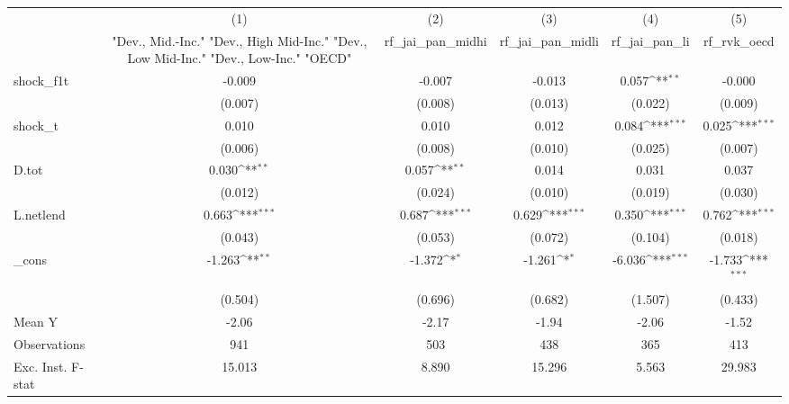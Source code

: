 {
\def\sym#1{\ifmmode^{#1}\else\(^{#1}\)\fi}
\begin{tabular}{l*{5}{c}}
\toprule
            &\multicolumn{1}{c}{(1)}&\multicolumn{1}{c}{(2)}&\multicolumn{1}{c}{(3)}&\multicolumn{1}{c}{(4)}&\multicolumn{1}{c}{(5)}\\
            &\multicolumn{1}{c}{ "Dev., Mid.-Inc." "Dev., High Mid-Inc." "Dev., Low Mid-Inc." "Dev., Low-Inc." "OECD" }&\multicolumn{1}{c}{rf\_jai\_pan\_midhi}&\multicolumn{1}{c}{rf\_jai\_pan\_midli}&\multicolumn{1}{c}{rf\_jai\_pan\_li}&\multicolumn{1}{c}{rf\_rvk\_oecd}\\
\midrule
shock\_f1t   &      -0.009         &      -0.007         &      -0.013         &       0.057\sym{**} &      -0.000         \\
            &     (0.007)         &     (0.008)         &     (0.013)         &     (0.022)         &     (0.009)         \\
\addlinespace
shock\_t     &       0.010         &       0.010         &       0.012         &       0.084\sym{***}&       0.025\sym{***}\\
            &     (0.006)         &     (0.008)         &     (0.010)         &     (0.025)         &     (0.007)         \\
\addlinespace
D.tot       &       0.030\sym{**} &       0.057\sym{**} &       0.014         &       0.031         &       0.037         \\
            &     (0.012)         &     (0.024)         &     (0.010)         &     (0.019)         &     (0.030)         \\
\addlinespace
L.netlend   &       0.663\sym{***}&       0.687\sym{***}&       0.629\sym{***}&       0.350\sym{***}&       0.762\sym{***}\\
            &     (0.043)         &     (0.053)         &     (0.072)         &     (0.104)         &     (0.018)         \\
\addlinespace
\_cons      &      -1.263\sym{**} &      -1.372\sym{*}  &      -1.261\sym{*}  &      -6.036\sym{***}&      -1.733\sym{***}\\
            &     (0.504)         &     (0.696)         &     (0.682)         &     (1.507)         &     (0.433)         \\
\midrule
Mean Y      &       -2.06         &       -2.17         &       -1.94         &       -2.06         &       -1.52         \\
Observations&         941         &         503         &         438         &         365         &         413         \\
Exc. Inst. F-stat&      15.013         &       8.890         &      15.296         &       5.563         &      29.983         \\
\bottomrule
\end{tabular}
}
